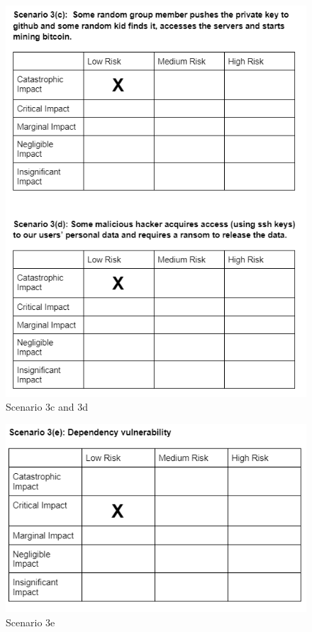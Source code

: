 \documentclass{article}
\begin{document}
\begin{figure}[h!]
    \centering
    \includegraphics[scale=0.5]{images/risk_2.PNG}
    \caption{ Scenario 3c and 3d }
\end{figure}

\begin{figure}[h!]
    \centering
    \includegraphics[scale=0.5]{images/risk_3.PNG}
    \caption{ Scenario 3e }
\end{figure}
\end{document}
